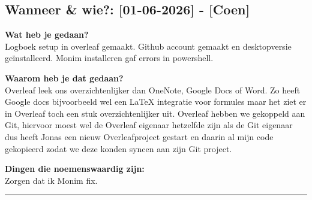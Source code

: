\subsection*{Wanneer \& wie?: [01-06-2026] - [Coen]}

\textbf{Wat heb je gedaan?}\\
Logboek setup in overleaf gemaakt. Github account gemaakt en desktopversie geïnstalleerd. Monim installeren gaf errors in powershell.
\vspace{0.3cm} 

\textbf{Waarom heb je dat gedaan?}\\
Overleaf leek ons overzichtenlijker dan OneNote, Google Docs of Word. Zo heeft Google docs bijvoorbeeld wel een LaTeX integratie voor formules maar het ziet er in Overleaf toch een stuk overzichtenlijker uit. Overleaf hebben we gekoppeld aan Git, hiervoor moest wel de Overleaf eigenaar hetzelfde zijn als de Git eigenaar dus heeft Jonas een nieuw Overleafproject gestart en daarin al mijn code gekopieerd zodat we deze konden syncen aan zijn Git project.
\vspace{0.3cm}

\textbf{Dingen die noemenswaardig zijn:}\\
Zorgen dat ik Monim fix.


\vspace{0.5cm}
\hrule 
\vspace{0.5cm}

